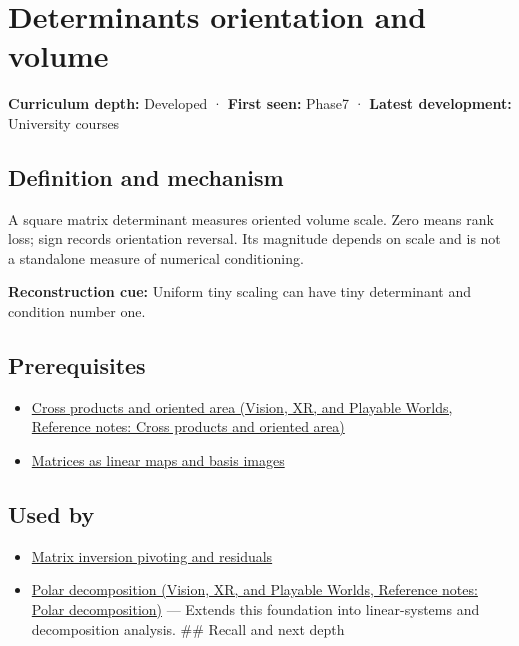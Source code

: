 \hypertarget{appendix-da478be01d02}{}\label{referencestart:appendix-da478be01d02}
\section{Determinants orientation and volume}\label{appendix-da478be01d02-determinants-orientation-and-volume}

\textbf{Curriculum depth:} Developed · \textbf{First seen:} Phase7 · \textbf{Latest development:} University courses

\subsection{Definition and mechanism}\label{appendix-da478be01d02-definition-and-mechanism}

A square matrix determinant measures oriented volume scale. Zero means rank loss; sign records orientation reversal. Its magnitude depends on scale and is not a standalone measure of numerical conditioning.

\textbf{Reconstruction cue:} Uniform tiny scaling can have tiny determinant and condition number one.

\subsection{Prerequisites}\label{appendix-da478be01d02-prerequisites}

\begin{itemize}
\tightlist
\item
  \href{../07-Vision-XR-and-Playable-Worlds/main.pdf\#nameddest=appendix-2391db8052b1}{Cross products and oriented area (Vision, XR, and Playable Worlds, Reference notes: Cross products and oriented area)}
\item
  \hyperref[appendix-bd39c3bf5d64]{Matrices as linear maps and basis images}
\end{itemize}

\subsection{Used by}\label{appendix-da478be01d02-used-by}

\begin{itemize}
\tightlist
\item
  \hyperref[appendix-48d2e66378ab]{Matrix inversion pivoting and residuals}
\item
  \href{../07-Vision-XR-and-Playable-Worlds/main.pdf\#nameddest=appendix-73f5bcf7a462}{Polar decomposition (Vision, XR, and Playable Worlds, Reference notes: Polar decomposition)} --- Extends this foundation into linear-systems and decomposition analysis. \#\# Recall and next depth
\end{itemize}

